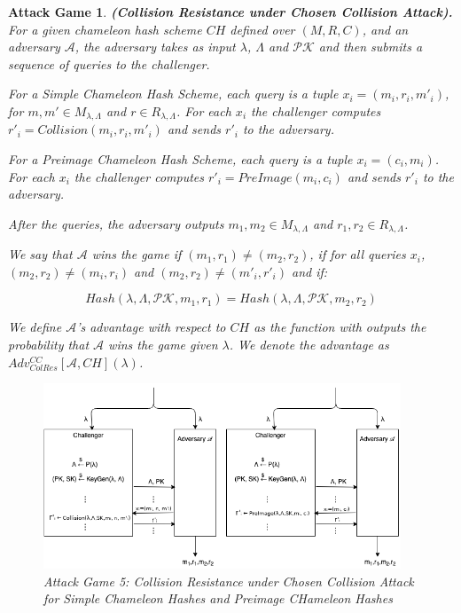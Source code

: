 \documentclass[a4paper]{article}
\newtheorem{game}{Attack Game}
\begin{document}
    \begin{game}
    \textbf{(Collision Resistance under Chosen Collision Attack).} For a
    given chameleon hash scheme $CH$ defined
    over $(M, R, C)$, and an adversary $\mathcal{A}$,
    the adversary takes as input $\lambda$, $\Lambda$ and $\mathcal{PK}$
    and then submits a sequence of queries to the challenger.
    
    For a Simple Chameleon Hash Scheme, each query is a tuple 
    $x_i=(m_i, r_i, m'_i)$, for $m, m' \in M_{\lambda,\Lambda}$ and 
    $r \in R_{\lambda,\Lambda}$. For each $x_i$ the challenger
    computes $r'_i= Collision(m_i, r_i, m'_i)$
    and sends $r'_i$ to the adversary.
    
    For a Preimage Chameleon Hash Scheme, each query is a tuple
    $x_i=(c_i, m_i)$. For each $x_i$ the challenger computes 
    $r'_i=PreImage(m_i, c_i)$ and sends $r'_i$ to the adversary.
    
    After the queries, the adversary
    outputs $m_1, m_2 \in M_{\lambda,\Lambda}$ and
    $r_1, r_2 \in R_{\lambda,\Lambda}$.
    
    We say that $\mathcal{A}$ wins the game if 
    $(m_1, r_1) \neq (m_2, r_2)$, if for all queries $x_i$,
    $(m_2, r_2) \neq (m_i, r_i)$ and $(m_2, r_2) \neq (m'_i, r'_i)$
    and if:
    
    $$
    Hash(\lambda, \Lambda, \mathcal{PK}, m_1, r_1)=
    Hash(\lambda,\Lambda,\mathcal{PK}, m_2, r_2)
    $$
    
    We define $\mathcal{A}$'s advantage with respect to $CH$ as the
    function with outputs the probability that $\mathcal{A}$ wins the game
    given $\lambda$. We denote the advantage as
    $Adv_{ColRes}^{CC}[\mathcal{A},CH](\lambda)$.
    
    \begin{figure}
      \centering
          \includegraphics[width=0.95\textwidth]{imagens/col_res_cc.png}
      \caption{Attack Game 5: Collision Resistance under Chosen Collision
      Attack for Simple Chameleon Hashes and Preimage CHameleon Hashes}
    \end{figure}
    \end{game}
    
\end{document}
